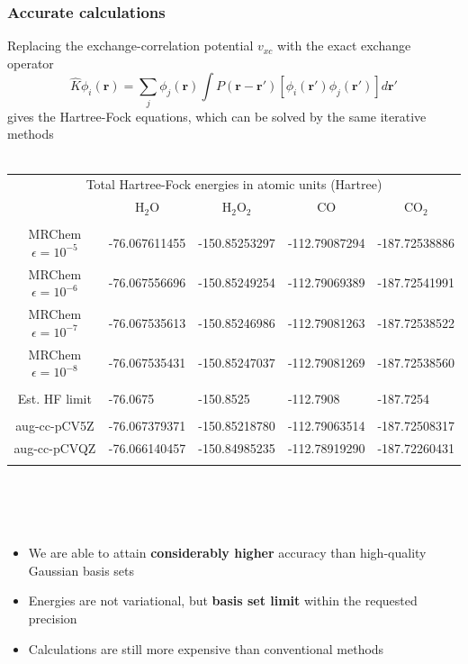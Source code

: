 \documentclass[mathserif, 8pt]{beamer}
\begin{document}
\begin{frame}
    \frametitle{Accurate calculations}
    \centering
    Replacing the exchange-correlation potential $v_{xc}$ with the exact exchange operator
    \begin{equation}
	\nonumber
	\hat{K}\phi_i(\boldsymbol{r}) = \sum_j \phi_j(\boldsymbol{r}) \int P(\boldsymbol{r}-\boldsymbol{r}')
	    \left[\phi_i(\boldsymbol{r}')\phi_j(\boldsymbol{r}')\right] d\boldsymbol{r}'
    \end{equation}
    gives the Hartree-Fock equations, which can be solved by the same iterative methods
    \ \\
    \ \\
\begin{table}
\tiny
\begin{tabular}{cllll}
\hline   
\hline
\multicolumn{5}{c}{Total Hartree-Fock energies in atomic units (Hartree)}\\
&\multicolumn{1}{c}{H$_2$O}
&\multicolumn{1}{c}{H$_2$O$_2$}
&\multicolumn{1}{c}{CO}
&\multicolumn{1}{c}{CO$_2$}\\
\hline 
            		    &               &               &               &               \\
MRChem $\epsilon=10^{-5}$   & -76.067611455 & -150.85253297 & -112.79087294 & -187.72538886 \\
MRChem $\epsilon=10^{-6}$   & -76.067556696 & -150.85249254 & -112.79069389 & -187.72541991 \\
MRChem $\epsilon=10^{-7}$   & -76.067535613 & -150.85246986 & -112.79081263 & -187.72538522 \\
MRChem $\epsilon=10^{-8}$   & -76.067535431 & -150.85247037 & -112.79081269 & -187.72538560 \\
            		    &               &               &               &               \\
Est. HF limit		    & -76.0675      & -150.8525     & -112.7908     & -187.7254     \\
            		    &               &               &               &               \\
aug-cc-pCV5Z		    & -76.067379371 & -150.85218780 & -112.79063514 & -187.72508317 \\
aug-cc-pCVQZ		    & -76.066140457 & -150.84985235 & -112.78919290 & -187.72260431 \\
            		    &               &               &               &               \\
\hline   
\hline   
\end{tabular}
\end{table}
\ \\
\ \\
\ \\
\begin{itemize}
    \item We are able to attain \textbf{considerably higher} accuracy than high-quality Gaussian basis sets
    \item Energies are not variational, but \textbf{basis set limit} within the requested precision
    \item Calculations are still more expensive than conventional methods
\end{itemize}
\end{frame}
\end{document}
